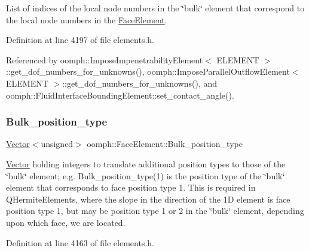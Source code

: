 List of indices of the local node numbers in the \char`\"{}bulk\char`\"{} element that correspond to the local node numbers in the \hyperlink{classoomph_1_1FaceElement}{Face\+Element}. 



Definition at line 4197 of file elements.\+h.



Referenced by oomph\+::\+Impose\+Impenetrability\+Element$<$ E\+L\+E\+M\+E\+N\+T $>$\+::get\+\_\+dof\+\_\+numbers\+\_\+for\+\_\+unknowns(), oomph\+::\+Impose\+Parallel\+Outflow\+Element$<$ E\+L\+E\+M\+E\+N\+T $>$\+::get\+\_\+dof\+\_\+numbers\+\_\+for\+\_\+unknowns(), and oomph\+::\+Fluid\+Interface\+Bounding\+Element\+::set\+\_\+contact\+\_\+angle().

\mbox{\label{classoomph_1_1FaceElement_a94b5c274338bd257c0d18b381b216984}} 
\subsubsection{\texorpdfstring{Bulk\+\_\+position\+\_\+type}{Bulk\_position\_type}}
{\footnotesize\ttfamily \hyperlink{classoomph_1_1Vector}{Vector}$<$unsigned$>$ oomph\+::\+Face\+Element\+::\+Bulk\+\_\+position\+\_\+type\hspace{0.3cm}{\ttfamily [private]}}



\hyperlink{classoomph_1_1Vector}{Vector} holding integers to translate additional position types to those of the \char`\"{}bulk\char`\"{} element; e.\+g. Bulk\+\_\+position\+\_\+type(1) is the position type of the \char`\"{}bulk\char`\"{} element that corresponds to face position type 1. This is required in Q\+Hermite\+Elements, where the slope in the direction of the 1D element is face position type 1, but may be position type 1 or 2 in the \char`\"{}bulk\char`\"{} element, depending upon which face, we are located. 



Definition at line 4163 of file elements.\+h.

\mbox{\label{classoomph_1_1FaceElement_a528cd1e95e0c231f757e54b751c50f8f}} 
